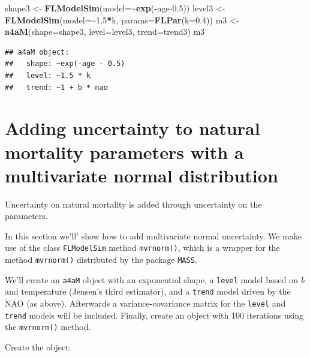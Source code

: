 \documentclass[
]{book}
\newenvironment{Shaded}{\begin{snugshade}}{\end{snugshade}}
\newcommand{\AttributeTok}[1]{\textcolor[rgb]{0.13,0.29,0.53}{#1}}
\newcommand{\FloatTok}[1]{\textcolor[rgb]{0.00,0.00,0.81}{#1}}
\newcommand{\FunctionTok}[1]{\textcolor[rgb]{0.13,0.29,0.53}{\textbf{#1}}}
\newcommand{\NormalTok}[1]{#1}
\newcommand{\OtherTok}[1]{\textcolor[rgb]{0.56,0.35,0.01}{#1}}
\newcommand{\SpecialCharTok}[1]{\textcolor[rgb]{0.81,0.36,0.00}{\textbf{#1}}}
\begin{document}
\begin{Shaded}
\begin{Highlighting}[]
\NormalTok{shape3 }\OtherTok{\textless{}{-}} \FunctionTok{FLModelSim}\NormalTok{(}\AttributeTok{model=}\SpecialCharTok{\textasciitilde{}}\FunctionTok{exp}\NormalTok{(}\SpecialCharTok{{-}}\NormalTok{age}\FloatTok{{-}0.5}\NormalTok{))}
\NormalTok{level3 }\OtherTok{\textless{}{-}} \FunctionTok{FLModelSim}\NormalTok{(}\AttributeTok{model=}\SpecialCharTok{\textasciitilde{}}\FloatTok{1.5}\SpecialCharTok{*}\NormalTok{k, }\AttributeTok{params=}\FunctionTok{FLPar}\NormalTok{(}\AttributeTok{k=}\FloatTok{0.4}\NormalTok{))}
\NormalTok{m3 }\OtherTok{\textless{}{-}} \FunctionTok{a4aM}\NormalTok{(}\AttributeTok{shape=}\NormalTok{shape3, }\AttributeTok{level=}\NormalTok{level3, }\AttributeTok{trend=}\NormalTok{trend3)}
\NormalTok{m3}
\end{Highlighting}
\end{Shaded}

\begin{verbatim}
## a4aM object:
##   shape: ~exp(-age - 0.5)
##   level: ~1.5 * k
##   trend: ~1 + b * nao
\end{verbatim}

\hypertarget{adding-uncertainty-to-natural-mortality-parameters-with-a-multivariate-normal-distribution}{%
\section{Adding uncertainty to natural mortality parameters with a multivariate normal distribution}\label{adding-uncertainty-to-natural-mortality-parameters-with-a-multivariate-normal-distribution}}

Uncertainty on natural mortality is added through uncertainty on the parameters.

In this section we'll' show how to add multivariate normal uncertainty. We make use of the class \texttt{FLModelSim} method \texttt{mvrnorm()}, which is a wrapper for the method \texttt{mvrnorm()} distributed by the package \texttt{MASS}.

We'll create an \texttt{a4aM} object with an exponential shape, a \texttt{level} model based on \(k\) and temperature (Jensen's third estimator), and a \texttt{trend} model driven by the NAO (as above). Afterwards a variance-covariance matrix for the \texttt{level} and \texttt{trend} models will be included. Finally, create an object with 100 iterations using the \texttt{mvrnorm()} method.

Create the object:
\end{document}
